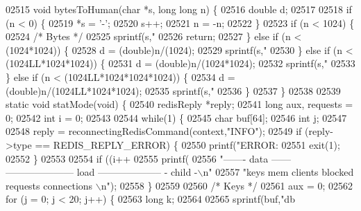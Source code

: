 \begin{DoxyCode}
{{{{{{{{{{{{{{{{{{{{{{{{{{{{{{{{{{{{{{{{{{{{{{{{{{{{{{{{{{{{{{{{{{{{{{{{{{{{{{{{{{{02515 \textcolor{keywordtype}{void} bytesToHuman(\textcolor{keywordtype}{char} *s, \textcolor{keywordtype}{long} \textcolor{keywordtype}{long} n) \{
02516     \textcolor{keywordtype}{double} d;
02517 
02518     \textcolor{keywordflow}{if} (n < 0) \{
02519         *s = \textcolor{stringliteral}{'-'};
02520         s++;
02521         n = -n;
02522     \}
02523     \textcolor{keywordflow}{if} (n < 1024) \{
02524         \textcolor{comment}{/* Bytes */}
02525         sprintf(s,\textcolor{stringliteral}{"%
02526         \textcolor{keywordflow}{return};
02527     \} \textcolor{keywordflow}{else} \textcolor{keywordflow}{if} (n < (1024*1024)) \{
02528         d = (\textcolor{keywordtype}{double})n/(1024);
02529         sprintf(s,\textcolor{stringliteral}{"%
02530     \} \textcolor{keywordflow}{else} \textcolor{keywordflow}{if} (n < (1024LL*1024*1024)) \{
02531         d = (\textcolor{keywordtype}{double})n/(1024*1024);
02532         sprintf(s,\textcolor{stringliteral}{"%
02533     \} \textcolor{keywordflow}{else} \textcolor{keywordflow}{if} (n < (1024LL*1024*1024*1024)) \{
02534         d = (\textcolor{keywordtype}{double})n/(1024LL*1024*1024);
02535         sprintf(s,\textcolor{stringliteral}{"%
02536     \}
02537 \}
02538 
02539 \textcolor{keyword}{static} \textcolor{keywordtype}{void} statMode(\textcolor{keywordtype}{void}) \{
02540     redisReply *reply;
02541     \textcolor{keywordtype}{long} aux, requests = 0;
02542     \textcolor{keywordtype}{int} i = 0;
02543 
02544     \textcolor{keywordflow}{while}(1) \{
02545         \textcolor{keywordtype}{char} buf[64];
02546         \textcolor{keywordtype}{int} j;
02547 
02548         reply = reconnectingRedisCommand(context,\textcolor{stringliteral}{"INFO"});
02549         \textcolor{keywordflow}{if} (reply->type == REDIS\_REPLY\_ERROR) \{
02550             printf(\textcolor{stringliteral}{"ERROR: %
02551             exit(1);
02552         \}
02553 
02554         \textcolor{keywordflow}{if} ((i++ %
02555             printf(
02556 \textcolor{stringliteral}{"------- data ------ --------------------- load -------------------- - child -\(\backslash\)n"}
02557 \textcolor{stringliteral}{"keys       mem      clients blocked requests            connections          \(\backslash\)n"});
02558         \}
02559 
02560         \textcolor{comment}{/* Keys */}
02561         aux = 0;
02562         \textcolor{keywordflow}{for} (j = 0; j < 20; j++) \{
02563             \textcolor{keywordtype}{long} k;
02564 
02565             sprintf(buf,\textcolor{stringliteral}{"db%
}}}}}}}}}}}}}}}}}}}}}}}}}}}}}}}}}}}}}}}}}}}}}}}}}}}}}}}}}}}}}}}}}}}}}}}}}}}}}}}}}}}}}}}}}
\end{DoxyCode}
